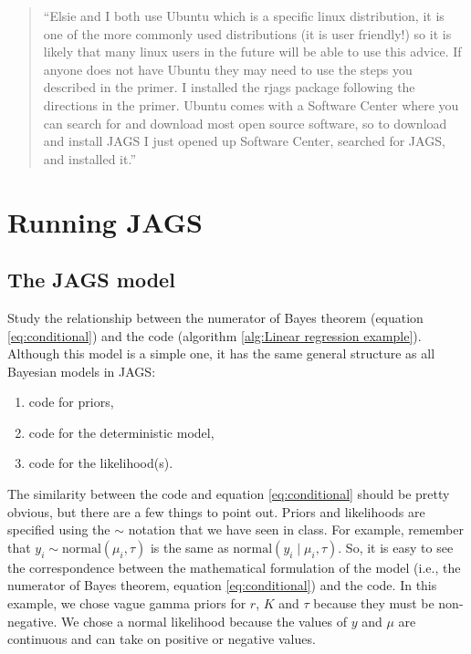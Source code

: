 \documentclass[12pt,english]{article}
\begin{document}
\begin{quotation}
``Elsie and I both use Ubuntu which is a specific linux distribution, it is one of the more commonly used distributions (it is user friendly!) so it is likely that many linux users in the future will be able to use this advice. If anyone does not have Ubuntu they may need to use the steps you described in the primer. I installed the rjags package following the directions in the primer. Ubuntu comes with a Software Center where you can search for and download most open source software, so to download and install JAGS I just opened up Software Center, searched for JAGS, and installed it.''
\end{quotation}


\section{Running JAGS}

\subsection{The JAGS model}

Study the relationship between the numerator of Bayes theorem (equation \ref{eq:conditional}) and the code (algorithm \ref{alg:Linear regression example}). Although this model is a simple one, it has the same general structure as all Bayesian models in JAGS:

\begin{enumerate}
\item code for priors,
\item code for the deterministic model,
\item code for the likelihood(s).
\end{enumerate}

The similarity between the code and equation \ref{eq:conditional} should be pretty obvious, but there are a few things to point out. Priors and likelihoods are specified using the $\sim$ notation that we have seen in class. For example, remember that $y_{i}  \sim  \textrm{normal}\left(\mu_{i},\tau\right)$ is the same as $\textrm{normal}\left(y_{i}\mid\mu_{i},\tau\right)$. So, it is easy to see the correspondence between the mathematical formulation of the model (i.e., the numerator of Bayes theorem, equation \ref{eq:conditional}) and the code. In this example, we chose vague gamma priors for $r$, $K$ and $\tau$ because they must be non-negative. We chose a normal likelihood because the values of $y$ and $\mu$ are continuous and can take on positive or negative values. 
\end{document}
